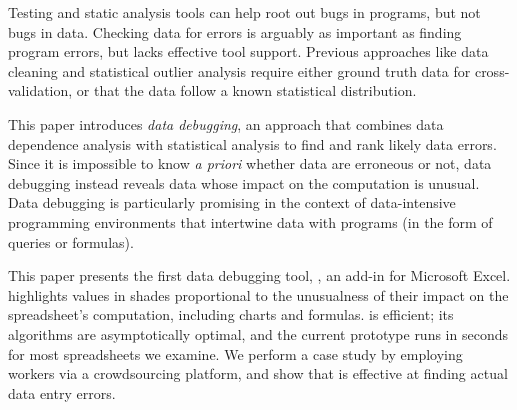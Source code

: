 Testing and static analysis tools can help root out bugs in programs,
but not bugs in data. Checking data for errors is arguably as
important as finding program errors, but lacks effective tool
support. Previous approaches like data cleaning and statistical
outlier analysis require either ground truth data for
cross-validation, or that the data follow a known statistical
distribution.

This paper introduces \emph{data debugging}, an approach that combines
data dependence analysis with statistical analysis to find and rank
likely data errors. Since it is impossible to know \emph{a priori}
whether data are erroneous or not, data debugging instead
reveals data whose impact on the computation is unusual.
Data debugging is particularly promising in the context of
data-intensive programming environments that intertwine data with
programs (in the form of queries or formulas).

This paper presents the first data debugging tool, \checkcell{}, an
add-in for Microsoft Excel. \checkcell{} highlights values in shades
proportional to the unusualness of their impact on the spreadsheet's
computation, including charts and formulas. \checkcell{} is efficient;
its algorithms are asymptotically optimal, and the current prototype
runs in seconds for most spreadsheets we examine. We perform a case
study by employing workers via a crowdsourcing platform, and show
that \checkcell{} is effective at finding actual data entry errors.

